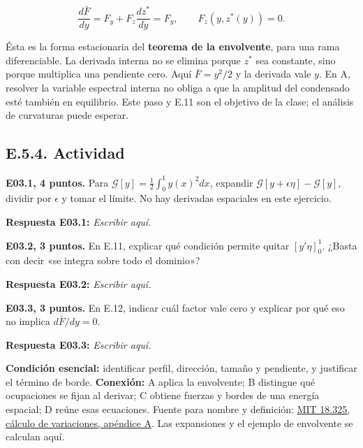 \documentclass[
  spanish,
  10pt,
  a4paper,
]{article}
\begin{document}
\[
\frac{d\bar F}{dy}=F_y+F_z\frac{dz^*}{dy}=F_y,
\qquad F_z(y,z^*(y))=0.
\tag{E.12}
\]

Ésta es la forma estacionaria del \textbf{teorema de la envolvente},
para una rama diferenciable. La derivada interna no se elimina porque
\(z^*\) sea constante, sino porque multiplica una pendiente cero. Aquí
\(\bar F=y^2/2\) y la derivada vale \(y\). En A, resolver la variable
espectral interna no obliga a que la amplitud del condensado esté
también en equilibrio. Este paso y E.11 son el objetivo de la clase; el
análisis de curvaturas puede esperar.

\subsection{E.5.4. Actividad}\label{e.5.4.-actividad}


\textbf{E03.1, 4 puntos.} Para
\(\mathcal G[y]=\frac12\int_0^1 y(x)^2dx\), expandir
\(\mathcal G[y+\epsilon\eta]-\mathcal G[y]\), dividir por \(\epsilon\) y
tomar el límite. No hay derivadas espaciales en este ejercicio.

\textbf{Respuesta E03.1:} \emph{Escribir aquí.}


\textbf{E03.2, 3 puntos.} En E.11, explicar qué condición permite quitar
\([y'\eta]_0^1\). ¿Basta con decir «se integra sobre todo el dominio»?

\textbf{Respuesta E03.2:} \emph{Escribir aquí.}


\textbf{E03.3, 3 puntos.} En E.12, indicar cuál factor vale cero y
explicar por qué eso no implica \(d\bar F/dy=0\).

\textbf{Respuesta E03.3:} \emph{Escribir aquí.}

\textbf{Condición esencial:} identificar perfil, dirección, tamaño y
pendiente, y justificar el término de borde. \textbf{Conexión:} A aplica
la envolvente; B distingue qué ocupaciones se fijan al derivar; C
obtiene fuerzas y bordes de una energía espacial; D reúne esas
ecuaciones. Fuente para nombre y definición:
\href{https://ocw.mit.edu/courses/18-325-topics-in-applied-mathematics-waves-and-imaging-fall-2015/834e98a77f64597a422c205b123cd6d7_MIT18_325F15_Appendix_A.pdf}{MIT
18.325, cálculo de variaciones, apéndice A}. Las expansiones y el
ejemplo de envolvente se calculan aquí.

\end{document}

